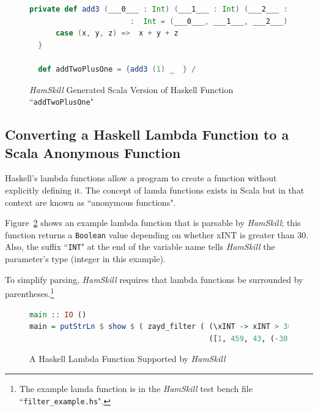 \documentclass{report}
\begin{document}
\begin{figure}[H]
\begin{mdframed}
\begin{lstlisting}[language=Scala, basicstyle=\scriptsize]
  private def add3 (___0___ : Int) (___1___ : Int) (___2___ : Int) 
                       :  Int = (___0___, ___1___, ___2___) match {
      case (x, y, z) =>  x + y + z
  } 

  def addTwoPlusOne = {add3 (1) _  } /
\end{lstlisting}
\end{mdframed}
\caption{\textit{HamSkill} Generated Scala Version of Haskell Function ``\texttt{addTwoPlusOne}"}\label{fig:scalaFunctionAddTwoPlusOne}
\end{figure}


\subsection{Converting a Haskell Lambda Function to a Scala Anonymous Function}\label{sec:lambdaAnonymousFunctions}

Haskell's lambda functions allow a program to create a function without explicitly defining it.  The concept of lamda functions exists in Scala but in that context are known as ``anonymous functions".

Figure~\ref{fig:haskellLambdaFunction} shows an example lambda function that is parsable by \textit{HamSkill}; this function returns a \texttt{Boolean} value depending on whether xINT is greater than 30.  Also, the suffix ``\texttt{INT}" at the end of the variable name tells \textit{HamSkill} the parameter's type (integer in this example).

To simplify parsing, \textit{HamSkill} requires that lambda functions be surrounded by parentheses.\footnote{The example lamda function is in the \textit{HamSkill} test bench file ``\texttt{filter\_example.hs}".}

\begin{figure}[H]
\begin{mdframed}
\begin{lstlisting}[language=Haskell, basicstyle=\scriptsize]
main :: IO ()
main = putStrLn $ show $ ( zayd_filter ( (\xINT -> xINT > 30) ) 
                                         ([1, 459, 43, (-30), 34]) )
\end{lstlisting}
\end{mdframed}
\caption{A Haskell Lambda Function Supported by \textit{HamSkill}}\label{fig:haskellLambdaFunction}
\end{figure}
\end{document}
